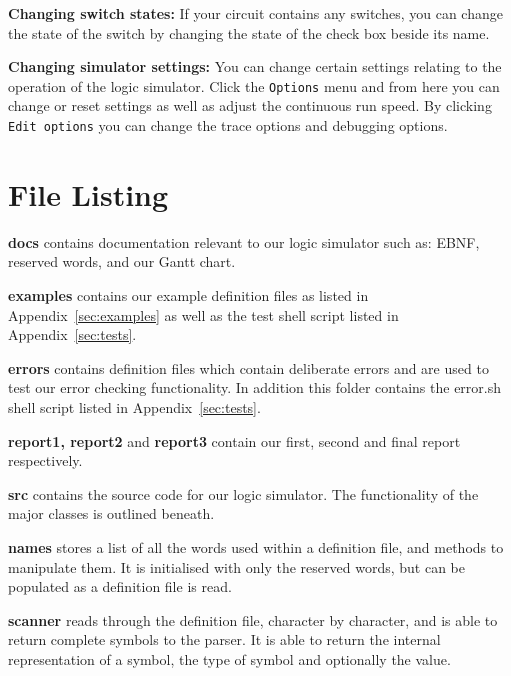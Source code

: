 \documentclass[a4paper,10pt]{article}
\begin{document}
\textbf{Changing switch states:} If your circuit contains any  switches, you can change the state of the switch by changing the state of the check box beside its name.

\textbf{Changing simulator settings:} You can change certain settings relating to the operation of the logic simulator. Click the \texttt{Options} menu and from here you can change or reset settings as well as adjust the continuous run speed. By clicking \texttt{Edit options} you can change the trace options and debugging options.


\pagebreak

\section{File Listing}
\setlength{\DTbaselineskip}{15pt}
\DTsetlength{.2em}{3em}{0.1em}{1pt}{4pt}

\textbf{docs} contains documentation relevant to our logic simulator such as: EBNF, reserved words, and our Gantt chart.

\textbf{examples} contains our example definition files as listed in Appendix~\ref{sec:examples} as well as the test shell script listed in Appendix~\ref{sec:tests}.

\textbf{errors} contains definition files which contain deliberate errors and are used to test our error checking functionality. In addition this folder contains the error.sh shell script listed in Appendix~\ref{sec:tests}.

\textbf{report1, report2} and \textbf{report3} contain our first, second and final report respectively.

\textbf{src} contains the source code for our logic simulator. The functionality of the major classes is outlined beneath.

\textbf{names} stores a list of all the words used within a definition file, and methods to manipulate them. It is initialised with only the reserved words, but can be populated as a definition file is read.

\textbf{scanner} reads through the definition file, character by character, and is able to return complete symbols to the parser. It is able to return the internal representation of a symbol, the type of symbol and optionally the value.
\end{document}
